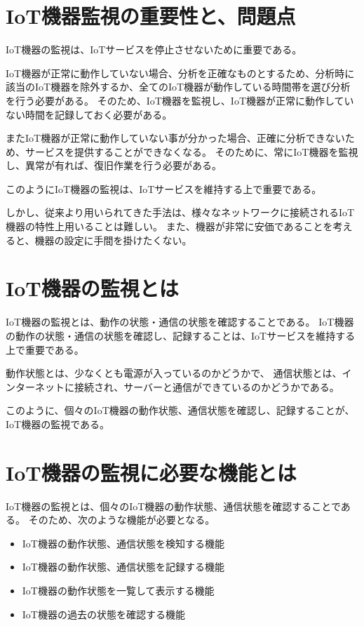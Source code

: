 \section{IoT機器監視の重要性と、問題点}
IoT機器の監視は、IoTサービスを停止させないために重要である。

IoT機器が正常に動作していない場合、分析を正確なものとするため、分析時に該当のIoT機器を除外するか、全てのIoT機器が動作している時間帯を選び分析を行う必要がある。
そのため、IoT機器を監視し、IoT機器が正常に動作していない時間を記録しておく必要がある。

またIoT機器が正常に動作していない事が分かった場合、正確に分析できないため、サービスを提供することができなくなる。
そのために、常にIoT機器を監視し、異常が有れば、復旧作業を行う必要がある。

このようにIoT機器の監視は、IoTサービスを維持する上で重要である。

しかし、従来より用いられてきた手法は、様々なネットワークに接続されるIoT機器の特性上用いることは難しい。
また、機器が非常に安価であることを考えると、機器の設定に手間を掛けたくない。

\section{IoT機器の監視とは}%
IoT機器の監視とは、動作の状態・通信の状態を確認することである。
IoT機器の動作の状態・通信の状態を確認し、記録することは、IoTサービスを維持する上で重要である。

動作状態とは、少なくとも電源が入っているのかどうかで、
通信状態とは、インターネットに接続され、サーバーと通信ができているのかどうかである。
\medskip

このように、個々のIoT機器の動作状態、通信状態を確認し、記録することが、IoT機器の監視である。

\section{IoT機器の監視に必要な機能とは}%
IoT機器の監視とは、個々のIoT機器の動作状態、通信状態を確認することである。
そのため、次のような機能が必要となる。
\begin{itemize}
	\item IoT機器の動作状態、通信状態を検知する機能
	\item IoT機器の動作状態、通信状態を記録する機能
	\item IoT機器の動作状態を一覧して表示する機能
	\item IoT機器の過去の状態を確認する機能
\end{itemize}


